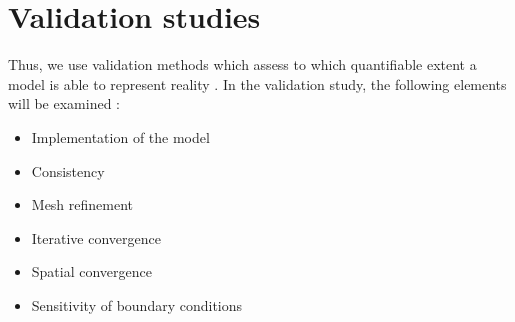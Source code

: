 
\chapter{Validation studies}
\label{chap:validation_&_verification_study}
\enlargethispage*{3cm}


\blindtext[1]

\blindtext[1]

Thus, we use validation methods which assess to which quantifiable extent a model is able to represent reality \citep{AIAA1998}. 
In the validation study, the following elements will be examined \citep{Slater2008,Franke2007}:

\begin{itemize}
	\item Implementation of the model
	\item Consistency
	\item Mesh refinement  
	\item Iterative convergence
	\item Spatial convergence	
	\item Sensitivity of boundary conditions	
\end{itemize}




